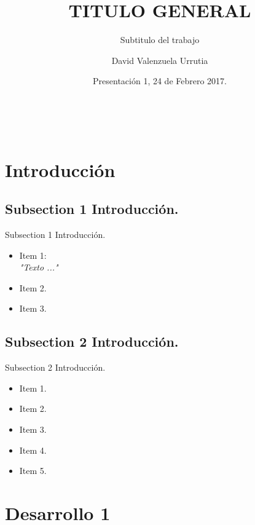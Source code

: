 \documentclass{beamer}
\title{TITULO GENERAL}
\subtitle{Subtitulo del trabajo}
\author{David Valenzuela Urrutia\inst{1} \inst{2}}
\institute[GeoInnova Consultores Ltda.] %
{
  \inst{1}%
  M.Sc.Electrical Engineering\\
  Universidad de Chile.
  \and
  \inst{2}%
    Ingeniero de proyectos I+D\\ 
    GeoInnova}
\date{Presentación 1,    24 de Febrero 2017.}
\begin{document}
\begin{frame}
  \titlepage
\end{frame}



\begin{frame}[shrink]{$~$}
\end{frame}





\section{Introducción}

\subsection{Subsection 1 Introducción.}
\begin{frame}{Subsection 1 Introducción.}
  \begin{itemize}
  \item Item 1:\\
  \textit{"Texto ..."}
  \pause
    \item Item 2.
  \pause
  \item Item 3.

  \end{itemize}

\end{frame}



\subsection{Subsection 2 Introducción.}
\begin{frame}{Subsection 2 Introducción.}

  \begin{itemize}
      \item Item 1.
      \item Item 2.
      \item Item 3.
      \item Item 4.
      \item Item 5.
  \end{itemize}
\end{frame}


\section{Desarrollo 1}
\end{document}
